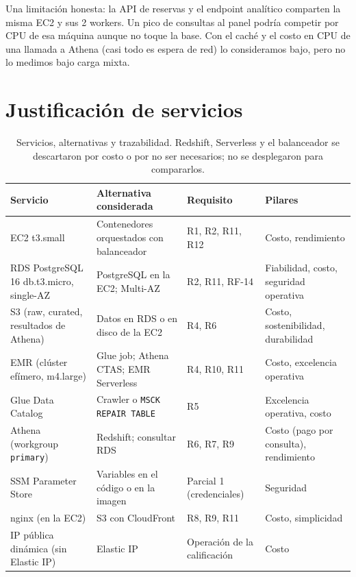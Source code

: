\documentclass[11pt,letterpaper]{article}
\begin{document}
Una limitación honesta: la API de reservas y el endpoint analítico comparten la misma EC2 y sus 2 workers. Un pico de consultas al panel podría competir por CPU de esa máquina aunque no toque la base. Con el caché y el costo en CPU de una llamada a Athena (casi todo es espera de red) lo consideramos bajo, pero no lo medimos bajo carga mixta.

\section{Justificación de servicios}
\begin{table}[H]
\centering
\begin{tabular}{L{2.4cm} L{3.7cm} L{3.4cm} L{4.6cm}}
\toprule
\textbf{Servicio} & \textbf{Alternativa considerada} & \textbf{Requisito} & \textbf{Pilares} \\
\midrule
EC2 t3.small & Contenedores orquestados con balanceador & R1, R2, R11, R12 & Costo, rendimiento \\
RDS PostgreSQL 16 db.t3.micro, single-AZ & PostgreSQL en la EC2; Multi-AZ & R2, R11, RF-14 & Fiabilidad, costo, seguridad operativa \\
S3 (raw, curated, resultados de Athena) & Datos en RDS o en disco de la EC2 & R4, R6 & Costo, sostenibilidad, durabilidad \\
EMR (clúster efímero, m4.large) & Glue job; Athena CTAS; EMR Serverless & R4, R10, R11 & Costo, excelencia operativa \\
Glue Data Catalog & Crawler o \texttt{MSCK REPAIR TABLE} & R5 & Excelencia operativa, costo \\
Athena (workgroup \texttt{primary}) & Redshift; consultar RDS & R6, R7, R9 & Costo (pago por consulta), rendimiento \\
SSM Parameter Store & Variables en el código o en la imagen & Parcial 1 (credenciales) & Seguridad \\
nginx (en la EC2) & S3 con CloudFront & R8, R9, R11 & Costo, simplicidad \\
IP pública dinámica (sin Elastic IP) & Elastic IP & Operación de la calificación & Costo \\
\bottomrule
\end{tabular}
\caption{Servicios, alternativas y trazabilidad. Redshift, Serverless y el balanceador se descartaron por costo o por no ser necesarios; no se desplegaron para compararlos.}
\end{table}
\end{document}
